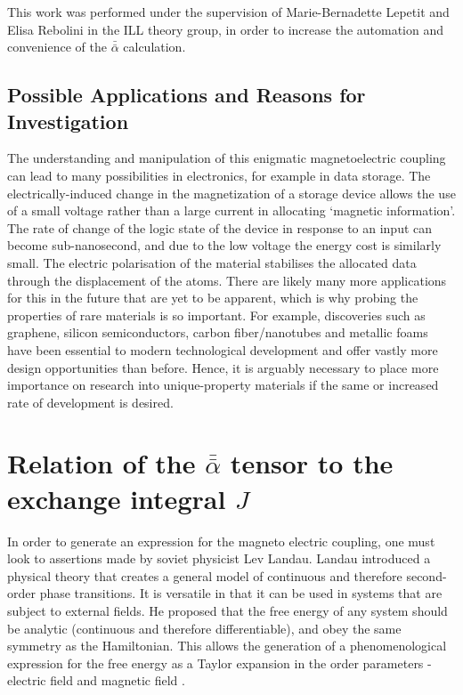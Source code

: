 \documentclass[10pt]{article}
\begin{document}
This work was performed under the supervision of Marie-Bernadette Lepetit and Elisa Rebolini in the ILL theory group, in order to increase the automation and convenience of the $\bar{\bar{\alpha}}$ calculation.

\subsection{Possible Applications and Reasons for Investigation}

The understanding and manipulation of this enigmatic magnetoelectric coupling can lead to many possibilities in electronics, for example in data storage. The electrically-induced change in the magnetization of a storage device allows the use of a small voltage rather than a large current in allocating `magnetic information'. The rate of change of the logic state of the device in response to an input can become sub-nanosecond, and due to the low voltage the energy cost is similarly small. The electric polarisation of the material stabilises the allocated data through the displacement of the atoms. There are likely many more applications for this in the future that are yet to be apparent, which is why probing the properties of rare materials is so important. For example, discoveries such as graphene, silicon semiconductors, carbon fiber/nanotubes and metallic foams have been essential to modern technological development and offer vastly more design opportunities than before. Hence, it is arguably necessary to place more importance on research into unique-property materials if the same or increased rate of development is desired. 

\section{Relation of the $\bar{\bar{\alpha}}$ tensor to the exchange integral $J$}

In order to generate an expression for the magneto electric coupling, one must look to assertions made by soviet physicist Lev Landau. Landau introduced a physical theory that creates a general model of continuous and therefore second-order phase transitions. It is versatile in that it can be used in systems that are subject to external fields. He proposed that the free energy of any system should be analytic (continuous and therefore differentiable), and obey the same symmetry as the Hamiltonian. This allows the generation of a phenomenological expression for the free energy as a Taylor expansion in the order parameters - electric field and magnetic field \cite{landau1936theory}.
\end{document}
